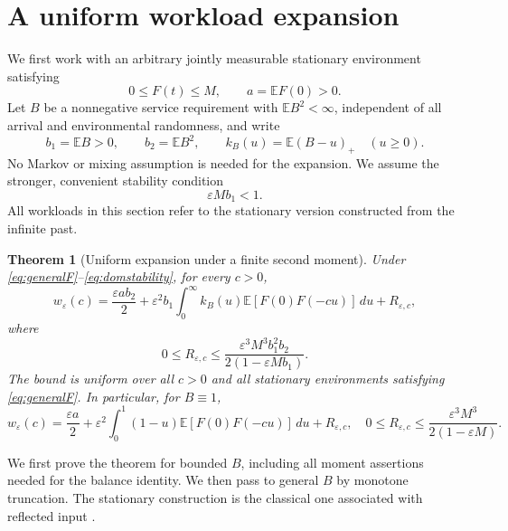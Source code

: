 \documentclass[10pt,a4paper]{amsart}
\numberwithin{equation}{section}
\newtheorem{theorem}{Theorem}[section]
\newcommand{\E}{\mathbb E}
\newcommand{\1}{\mathbf 1}
\newcommand{\eps}{\varepsilon}
\begin{document}
\section{A uniform workload expansion}\label{sec:expansion}
We first work with an arbitrary jointly measurable stationary environment satisfying
\begin{equation}\label{eq:generalF}
 0\le F(t)\le M,\qquad a=\E F(0)>0.
\end{equation}
Let $B$ be a nonnegative service requirement with $\E B^2<\infty$, independent of all arrival and environmental randomness, and write
\begin{equation}\label{eq:moments}
 b_1=\E B>0,\qquad b_2=\E B^2,
 \qquad k_B(u)=\E(B-u)_+\quad(u\ge0).
\end{equation}
No Markov or mixing assumption is needed for the expansion. We assume the stronger, convenient stability condition
\begin{equation}\label{eq:domstability}
 \eps M b_1<1.
\end{equation}
All workloads in this section refer to the stationary version constructed from the infinite past.


\begin{theorem}[Uniform expansion under a finite second moment]\label{thm:expansion}
Under \eqref{eq:generalF}--\eqref{eq:domstability}, for every $c>0$,
\begin{equation}\label{eq:expansion}
 w_\eps(c)=\frac{\eps a b_2}{2}
 +\eps^2 b_1\int_0^\infty k_B(u)\E[F(0)F(-cu)]\,du+R_{\eps,c},
\end{equation}
where
\begin{equation}\label{eq:remainder}
 0\le R_{\eps,c}\le
 \frac{\eps^3 M^3 b_1^2 b_2}{2(1-\eps M b_1)}.
\end{equation}
The bound is uniform over all $c>0$ and all stationary environments satisfying \eqref{eq:generalF}. In particular, for $B\equiv1$,
\begin{equation}\label{eq:unitexpansion}
 w_\eps(c)=\frac{\eps a}{2}
 +\eps^2\int_0^1(1-u)\E[F(0)F(-cu)]\,du+R_{\eps,c},
 \quad 0\le R_{\eps,c}\le\frac{\eps^3 M^3}{2(1-\eps M)}.
\end{equation}
\end{theorem}

We first prove the theorem for bounded $B$, including all moment assertions needed for the balance identity. We then pass to general $B$ by monotone truncation. The stationary construction is the classical one associated with reflected input \cite{Loynes62,Asmussen03}.
\end{document}
